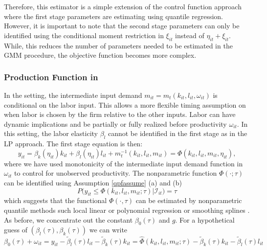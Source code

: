 \documentclass[11pt]{article}
\begin{document}
Therefore, this estimator is a simple extension of the control function approach where the first stage parameters are estimating using quantile regression. However, it is important to note that the second stage parameters can only be identified using the conditional moment restriction in $\xi_{it}$ instead of $\eta_{it}+\xi_{it}$. While, this reduces the number of parameters needed to be estimated in the GMM procedure, the objective function becomes more complex.

\subsubsection{Production Function in \cite{Ackerberg2015}}
In the \cite{Ackerberg2015} setting, the intermediate input demand $m_{it}=m_{t}(k_{it}, l_{it}, \omega_{it})$ is conditional on the labor input. This allows a more flexible timing assumption on when labor is chosen by the firm relative to the other inputs. Labor can have dynamic implications and be partially or fully realized before productivity $\omega_{it}$. In this setting, the labor elasticity $\beta_{l}$ cannot be identified in the first stage as in the LP approach. The first stage equation is then:
\begin{equation}\label{acf1}
y_{it}=\beta_{k}(\eta_{it})k_{it}+\beta_{l}(\eta_{it})l_{it}+m_{t}^{-1}(k_{it}, l_{it}, m_{it})=\Phi(k_{it}, l_{it}, m_{it}, \eta_{it}),
\end{equation}
where we have used monotonicity of the intermediate input demand function in $\omega_{it}$ to control for unobserved productivity. The nonparametric function $\Phi(\cdot;\tau)$ can be identified using Assumption \eqref{qpfassume} (a) and (b)
\begin{equation} \label{acfqpf1}
P\big(y_{it}\leq \Phi(k_{it}, l_{it}, m_{it}; \tau)\big|\mathcal{I}_{it})=\tau
\end{equation}
which suggests that the functional $\Phi(\cdot, \tau)$ can be estimated by nonparametric quantile methods such local linear or polynomial regression \cite{Chaudhuri1991,Chaudhuri1991a} or smoothing splines \cite{KOENKER1994}.\\
As before, we concentrate out the constant $\beta_{0}(\tau)$ and $g$. For a hypothetical guess of $(\beta_{l}(\tau), \beta_{k}(\tau))$ we can write
\begin{equation}
\beta_{0}(\tau)+\omega_{it}=y_{it}-\tilde{\beta}_{l}(\tau)l_{it}-\tilde{\beta}_{k}(\tau)k_{it}=\hat{\Phi}(k_{it}, l_{it}, m_{it}; \tau)-\tilde{\beta}_{k}(\tau)k_{it}-\tilde{\beta}_{l}(\tau)l_{it}
\end{equation}
\end{document}
